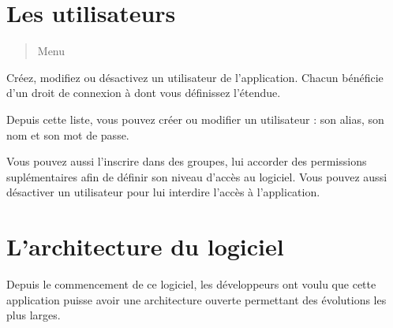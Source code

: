 \documentclass[a4paper,10pt,oneside,french]{sphinxmanual}
\begin{document}
\noindent{}


\section{Les utilisateurs}
\label{\detokenize{CORE/users:les-utilisateurs}}\label{\detokenize{CORE/users::doc}}\begin{quote}

\sphinxAtStartPar
Menu 
\end{quote}

\sphinxAtStartPar
Créez, modifiez ou désactivez un utilisateur de l’application. Chacun bénéficie d’un droit de connexion à  dont vous définissez l’étendue.

\noindent{}

\sphinxAtStartPar
Depuis cette liste, vous pouvez créer ou modifier un utilisateur : son alias, son nom et son mot de passe.

\noindent{}

\sphinxAtStartPar
Vous pouvez aussi l’inscrire dans des groupes, lui accorder des permissions suplémentaires afin de définir son niveau d’accès au logiciel. Vous pouvez aussi désactiver un utilisateur pour lui interdire l’accès à l’application.

\noindent{}


\section{L’architecture du logiciel}
\label{\detokenize{CORE/architecture:l-architecture-du-logiciel}}\label{\detokenize{CORE/architecture::doc}}
\sphinxAtStartPar
Depuis le commencement de ce logiciel, les développeurs ont voulu que cette application puisse avoir une architecture ouverte permettant des évolutions les plus larges.



\renewcommand{\indexname}{Index}
\printindex
\end{document}
